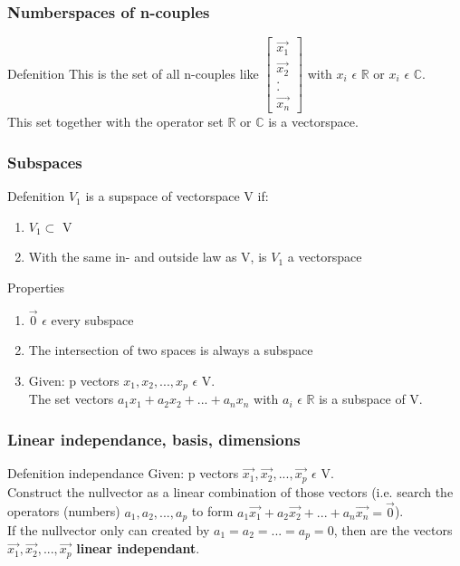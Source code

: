 \begin{frame}
	\frametitle{Numberspaces of n-couples}
	\begin{block}{Defenition}
		This is the set of all n-couples like 
		$\begin{bmatrix}
			\overrightarrow{x_1}\\
			\overrightarrow{x_2}\\
			.\\
			.\\
			\overrightarrow{x_n}
		\end{bmatrix}$ with $x_i$ $\epsilon$ $\mathbb{R}$ or $x_i$ $\epsilon$ $\mathbb{C}$.\\
		This set together with the operator set $\mathbb{R}$ or $\mathbb{C}$ is a vectorspace.
	\end{block}
\end{frame}
		
\begin{frame}
	\frametitle{Subspaces}
	\begin{block}{Defenition}
		$V_1$ is a supspace of vectorspace V if:\\ 
		\begin{enumerate}
			\item $V_1 \subset$ V
			\item With the same in- and outside law as V, is $V_1$ a vectorspace
		\end{enumerate}
	\end{block}
	\begin{block}{Properties}
		\begin{enumerate}
			\item $\overrightarrow{0}$ $\epsilon$ every subspace
			\item The intersection of two spaces is always a subspace
			\item Given: p vectors $x_1,x_2,...,x_p$ $\epsilon$ V.\\
			The set vectors $a_1x_1+a_2x_2+...+a_nx_n$ with $a_i$ $\epsilon$ $\mathbb{R}$ is a subspace of V.
		\end{enumerate}
	\end{block}
\end{frame}

\begin{frame}
	\frametitle{Linear independance, basis, dimensions}
	\begin{block}{Defenition independance}
		Given: p vectors $\overrightarrow{x_1},\overrightarrow{x_2},...,\overrightarrow{x_p}$ $\epsilon$ V.\\
		Construct the nullvector as a linear combination of those vectors (i.e. search the operators (numbers) $a_1,a_2,...,a_p$ to form $a_1\overrightarrow{x_1}+a_2\overrightarrow{x_2}+...+a_n\overrightarrow{x_n}=\overrightarrow{0}$).\\
		If the nullvector only can created by $a_1=a_2=...=a_p=0$, then are the vectors $\overrightarrow{x_1},\overrightarrow{x_2},...,\overrightarrow{x_p}$ {\bf linear independant}.
	\end{block}
\end{frame}

